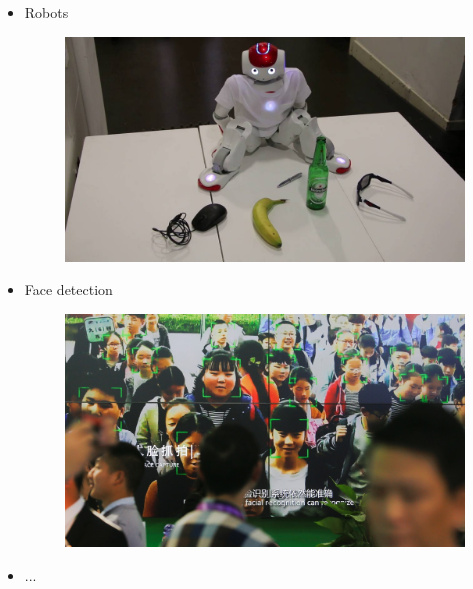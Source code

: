 \documentclass{beamer}[10pt, usepdftitle=false, handout]
\begin{document}
	\begin{frame}
	
	\begin{itemize}
	\item{Robots
	
	\begin{figure}
		\includegraphics[scale=0.1]{23.jpg} 
	\end{figure}	
	
	}	
	\item{Face detection 
	
	\begin{figure}
		\includegraphics[scale=0.1]{24.jpg} 
	\end{figure}			
	}
	\item{...}
	
	\end{itemize}
	
	\end{frame}	
	
\end{document}
